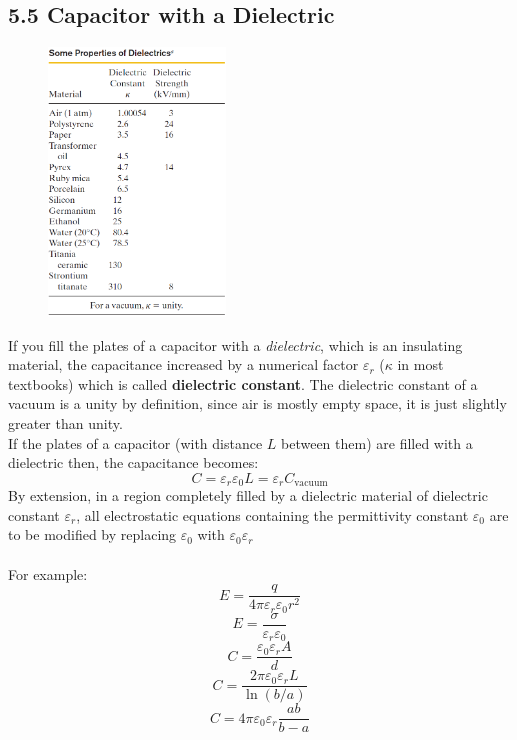 \documentclass[12pt, a4paper]{article}
\begin{document}
		
		
		\subsection*{5.5 Capacitor with a Dielectric}

		\begin{figure}
			\centering
			\includegraphics[width=4.7cm]{Physics2_PNGs/dielectrics.png}
			\caption*{}
			\label{fig:dielectrics.png}
		\end{figure}	
		If you fill the plates of a capacitor with a \textit{dielectric}, which is an insulating material, the capacitance increased by a numerical factor $\varepsilon_r$ ($\kappa$ in most textbooks) which is called \textbf{dielectric constant}. The dielectric constant of a vacuum is a unity by definition, since air is mostly empty space, it is just slightly greater than unity. \\
		If the plates of a capacitor (with distance $L$ between them) are filled with a dielectric then, the capacitance becomes:
		\[
			C = \varepsilon_r \varepsilon_0 L = \varepsilon_r C_{\text{vacuum}}
			\tag{5-25}
		\]
		By extension, in a region completely filled by a dielectric material of dielectric constant $\varepsilon_r$, all electrostatic equations containing the permittivity constant $\varepsilon_0$ are to be modified by replacing $\varepsilon_0$ with $\varepsilon_0 \varepsilon_r$\\ \\ \newpage
		For example:
		\[
			E = \frac{q}{4 \pi \varepsilon_r \varepsilon_0 r^2}
			\tag{Coulomb's Law for Point Charge, 5-26}
		\]
		\[
			E = \frac{\sigma}{\varepsilon_r \varepsilon_0}
			\tag{Electric Field just outside isolated conductor, 5-27}
		\]
		\[
			C = \frac{\varepsilon_0 \varepsilon_r A}{d}
			\tag{Parallel-Plate Capacitor, 5-28}
		\]
		\[
			C = \frac{2 \pi \varepsilon_0 \varepsilon_r L}{\ln (b/a)}
			\tag{Cylindrical Capacitor, 5-29}
		\]
		\[
			C = 4 \pi \varepsilon_0 \varepsilon_r \frac{ab}{b - a}
			\tag{Spherical Capacitor, 5-30}
		\]
		
\end{document}
